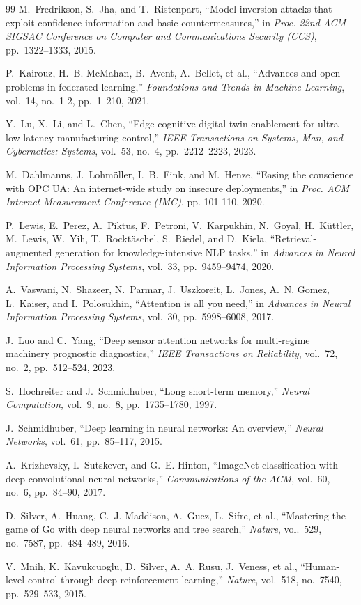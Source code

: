 \documentclass[journal,10pt,compsoc]{IEEEtran}
\begin{document}
\begin{thebibliography}{99}
M.~Fredrikson, S.~Jha, and T.~Ristenpart, ``Model inversion attacks that exploit confidence information and basic countermeasures,'' in \emph{Proc. 22nd ACM SIGSAC Conference on Computer and Communications Security (CCS)}, pp.~1322--1333, 2015.

P.~Kairouz, H.~B. McMahan, B.~Avent, A.~Bellet, et al., ``Advances and open problems in federated learning,'' \emph{Foundations and Trends in Machine Learning}, vol.~14, no.~1-2, pp.~1--210, 2021.

Y.~Lu, X.~Li, and L.~Chen, ``Edge-cognitive digital twin enablement for ultra-low-latency manufacturing control,'' \emph{IEEE Transactions on Systems, Man, and Cybernetics: Systems}, vol.~53, no.~4, pp.~2212--2223, 2023.

M.~Dahlmanns, J.~Lohmöller, I.~B.~Fink, and M.~Henze, ``Easing the conscience with OPC UA: An internet-wide study on insecure deployments,'' in \emph{Proc. ACM Internet Measurement Conference (IMC)}, pp. 101-110, 2020.

P.~Lewis, E.~Perez, A.~Piktus, F.~Petroni, V.~Karpukhin, N.~Goyal, H.~Küttler, M.~Lewis, W.~Yih, T.~Rocktäschel, S.~Riedel, and D.~Kiela, ``Retrieval-augmented generation for knowledge-intensive NLP tasks,'' in \emph{Advances in Neural Information Processing Systems}, vol.~33, pp.~9459--9474, 2020.

A.~Vaswani, N.~Shazeer, N.~Parmar, J.~Uszkoreit, L.~Jones, A.~N. Gomez, L.~Kaiser, and I.~Polosukhin, ``Attention is all you need,'' in \emph{Advances in Neural Information Processing Systems}, vol.~30, pp.~5998--6008, 2017.

J.~Luo and C.~Yang, ``Deep sensor attention networks for multi-regime machinery prognostic diagnostics,'' \emph{IEEE Transactions on Reliability}, vol.~72, no.~2, pp.~512--524, 2023.

S.~Hochreiter and J.~Schmidhuber, ``Long short-term memory,'' \emph{Neural Computation}, vol.~9, no.~8, pp.~1735--1780, 1997.

J.~Schmidhuber, ``Deep learning in neural networks: An overview,'' \emph{Neural Networks}, vol.~61, pp.~85--117, 2015.

A.~Krizhevsky, I.~Sutskever, and G.~E. Hinton, ``ImageNet classification with deep convolutional neural networks,'' \emph{Communications of the ACM}, vol.~60, no.~6, pp.~84--90, 2017.

D.~Silver, A.~Huang, C.~J. Maddison, A.~Guez, L.~Sifre, et al., ``Mastering the game of Go with deep neural networks and tree search,'' \emph{Nature}, vol.~529, no.~7587, pp.~484--489, 2016.

V.~Mnih, K.~Kavukcuoglu, D.~Silver, A.~A. Rusu, J.~Veness, et al., ``Human-level control through deep reinforcement learning,'' \emph{Nature}, vol.~518, no.~7540, pp.~529--533, 2015.
\end{thebibliography}
\end{document}

